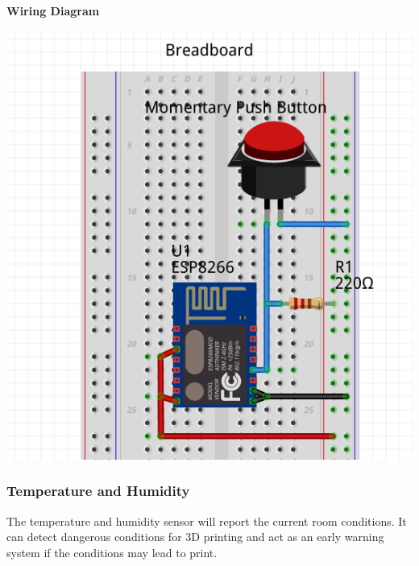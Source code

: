       \textbf{Wiring Diagram}\\
            \begin{center}
      \includegraphics[scale=0.25]{images/job-cir.png}
      \end{center}
    \subsubsection{Temperature and Humidity}
      The temperature and humidity sensor will report the current room conditions. It
      can detect dangerous conditions for 3D printing and act as an early warning system
      if the conditions may lead to print.\\

